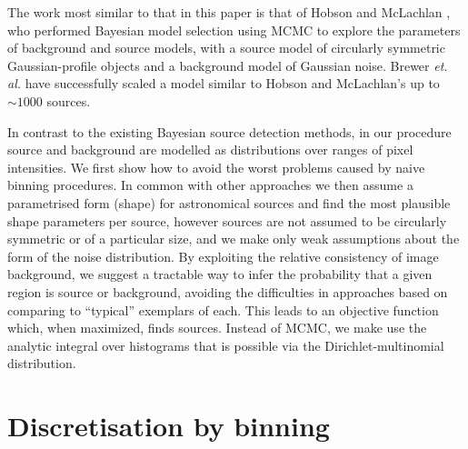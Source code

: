\documentclass[
    ,final            %
  ]
  {aipproc}
\begin{document}
The work most similar to that in this paper is that of Hobson and McLachlan \cite{hobson2003bayesian}, who performed Bayesian model selection using MCMC to explore the parameters of background and source models, with a source model of circularly symmetric Gaussian-profile objects and a background model of Gaussian noise. 
Brewer \textit{et. al.} \cite{brewer2013probabilistic} have successfully scaled a model similar to Hobson and McLachlan's \cite{hobson2003bayesian} up to $\sim 1000$ sources.

In contrast to the existing Bayesian source detection methods, in our procedure source and background are modelled as distributions over ranges of pixel intensities. We first show how to avoid the worst problems caused by naive binning procedures. In common with other approaches we then assume a parametrised form (shape) for astronomical sources and find the most plausible shape parameters per source, however sources are not assumed to be circularly symmetric or of a particular size, and we make only weak assumptions about the form of the noise distribution. By exploiting the relative consistency of image background, we suggest a tractable way to infer the probability that a given region is source or background, avoiding the difficulties in approaches based on comparing to ``typical'' exemplars of each. This leads to an objective function which, when maximized, finds sources. Instead of MCMC, we make use the analytic integral over histograms that is possible via the Dirichlet-multinomial distribution.


\section{Discretisation by binning}\label{sec:binning-strategies}
\end{document}
